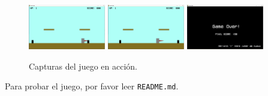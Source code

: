 \documentclass[letterpaper,11pt]{article} %
\begin{document}
	\begin{figure}[H]
		\centering
		\includegraphics[width=0.30\textwidth]{images/screencap_10}
		\hfill
		\includegraphics[width=0.30\textwidth]{images/screencap_11}
		\hfill
		\includegraphics[width=0.30\textwidth]{images/screencap_12}
		\caption{Capturas del juego en acción.}
	\end{figure}

	Para probar el juego, por favor leer \verb!README.md!.

\end{document}
